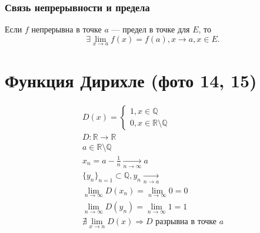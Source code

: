 \documentclass{article}
\begin{document}
\subsubsection{Связь непрерывности и предела}
Если $f$ непрерывна в точке $a$ --- предел в точке для $E$, то
\[
    \exists \lim_{x \to a} f(x) = f(a), x \to a, x \in E.
\]






\section{Функция Дирихле (фото 14, 15)}
\begin{gather*}
    D(x) =
    \begin{cases}
        1, x \in \mathbb{Q} \\
        0, x \in \mathbb{R} \setminus \mathbb{Q}
    \end{cases} \\
    D: \mathbb{R} \rightarrow \mathbb{R} \\
    a \in \mathbb{R} \setminus \mathbb{Q} \\
    x_n = a - \frac{1}{n} \underset{n \to \infty}{\longrightarrow} a \\
    \{y_n\}_{n = 1} \subset \mathbb{Q}, y_n \underset{n \to a}{\longrightarrow} \\
    \lim_{n \to \infty} D(x_n) = \lim_{n \to \infty} 0 = 0 \\
    \lim_{n \to \infty} D(y_n) = \lim_{n \to \infty} 1 = 1 \\
    \nexists \lim_{x \to n} D(x) \Rightarrow D \text{ разрывна в точке } a
\end{gather*}
\end{document}
